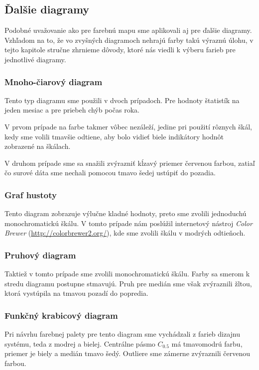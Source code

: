 
\subsection{Ďalšie diagramy}
Podobné uvažovanie ako pre farebnú mapu sme aplikovali aj pre ďalšie diagramy. Vzhľadom na to, že vo zvyšných diagramoch nehrajú farby takú výraznú úlohu, v tejto kapitole stručne zhrnieme dôvody, ktoré nás viedli k výberu farieb pre jednotlivé diagramy.

\subsubsection{Mnoho-čiarový diagram} 
Tento typ diagramu sme použili v dvoch prípadoch. Pre hodnoty štatistík na jeden mesiac a pre priebeh chýb počas roka.

V prvom prípade na farbe takmer vôbec nezáleží, jedine pri použití rôznych škál, kedy sme volili tmavšie odtiene, aby bolo vidieť biele indikátory hodnôt zobrazené na škálach.

V druhom prípade sme sa snažili zvýrazniť kĺzavý priemer červenou farbou, zatiaľ čo surové dáta sme nechali pomocou tmavo šedej ustúpiť do pozadia.

\subsubsection{Graf hustoty} 
Tento diagram zobrazuje výlučne kladné hodnoty, preto sme zvolili jednoduchú monochromatickú škálu. V tomto prípade nám poslúžil internetový nástroj \textit{Color Brewer} (\url{http://colorbrewer2.org/}), kde sme zvolili škálu v modrých odtieňoch.

\subsubsection{Pruhový diagram} 
Taktiež v tomto prípade sme zvolili monochromatickú škálu. Farby sa smerom k stredu diagramu postupne stmavujú. Pruh pre medián sme však zvýraznili žltou, ktorá vystúpila na tmavou pozadí do popredia.

\subsubsection{Funkčný krabicový diagram} 
Pri návrhu farebnej palety pre tento diagram sme vychádzali z farieb dizajnu systému, teda z modrej a bielej. Centrálne pásmo $ C_{0.5} $ má tmavomodrú farbu, priemer je biely a medián tmavo šedý. Outliere sme zámerne zvýraznili červenou farbou.

